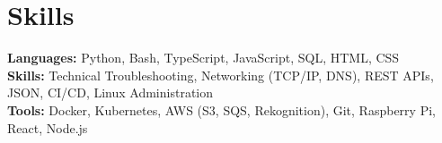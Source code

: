 \documentclass[11pt]{article}       %
\begin{document}

\vspace{-18.5pt}


\section*{Skills}
\textbf{Languages:} Python, Bash, TypeScript, JavaScript, SQL, HTML, CSS\\
\textbf{Skills:} Technical Troubleshooting, Networking (TCP/IP, DNS), REST APIs, JSON, CI/CD, Linux Administration\\
\textbf{Tools:} Docker, Kubernetes, AWS (S3, SQS, Rekognition), Git, Raspberry Pi, React, Node.js\\

\vspace{-6.5pt}
\end{document}
